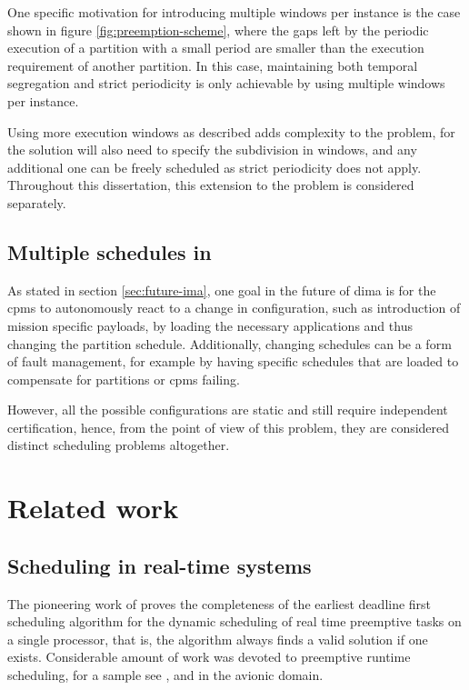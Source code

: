 \documentclass[main.tex]{subfiles}
\begin{document}
One specific motivation for introducing multiple windows per instance is the case shown in figure \ref{fig:preemption-scheme}, where the gaps left by the periodic execution of a partition with a small period are smaller than the execution requirement of another partition. 
In this case, maintaining both temporal segregation and strict periodicity is only achievable by using multiple windows per instance.

Using more execution windows as described adds complexity to the problem, for the solution will also need to specify the subdivision in windows, and any additional one can be freely scheduled as strict periodicity does not apply.
Throughout this dissertation, this extension to the problem is considered separately.

\subsection{Multiple schedules in }

As stated in section \ref{sec:future-ima}, one goal in the future of \gls{dima} is for the \glspl{cpm} to autonomously react to a change in configuration, such as introduction of mission specific payloads, by loading the necessary applications and thus changing the partition schedule.
Additionally, changing schedules can be a form of fault management, for example by having specific schedules that are loaded to compensate for partitions or \glspl{cpm} failing.

However, all the possible configurations are static and still require independent certification, hence, from the point of view of this problem, they are considered distinct scheduling problems altogether.

\section{Related work}
\label{sec:related}

\subsection{Scheduling in real-time systems}

The pioneering work of \Textcite{liu1973scheduling} proves the completeness of the earliest deadline first scheduling algorithm for the dynamic scheduling of real time preemptive tasks on a single processor, that is, the algorithm always finds a valid solution if one exists.
Considerable amount of work was devoted to preemptive runtime scheduling, for a sample see \textcite{buttazzo2011hard}, and \textcite{easwaran2009compositional} in the avionic domain.
\end{document}
